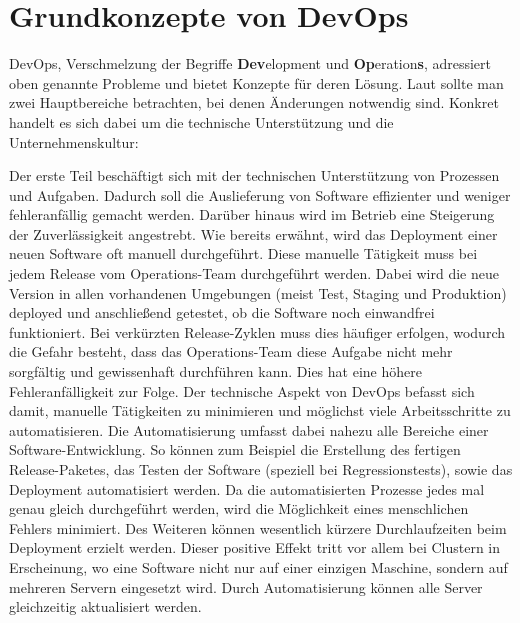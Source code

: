 \section{Grundkonzepte von DevOps}
DevOps, Verschmelzung der Begriffe \textbf{Dev}elopment und \textbf{Op}eration\textbf{s}, adressiert oben genannte Probleme und bietet Konzepte für deren Lösung. Laut \cite{wolff2014} sollte man zwei Hauptbereiche betrachten, bei denen Änderungen notwendig sind. Konkret handelt es sich dabei um die technische Unterstützung und die Unternehmenskultur:

Der erste Teil beschäftigt sich mit der technischen Unterstützung von Prozessen und Aufgaben. Dadurch soll die Auslieferung von Software effizienter und weniger fehleranfällig gemacht werden. Darüber hinaus wird im Betrieb eine Steigerung der Zuverlässigkeit angestrebt. Wie bereits erwähnt, wird das Deployment einer neuen Software oft manuell durchgeführt. Diese manuelle Tätigkeit muss bei jedem Release vom Operations-Team durchgeführt werden. Dabei wird die neue Version in allen vorhandenen Umgebungen (meist Test, Staging und Produktion) deployed und anschließend getestet, ob die Software noch einwandfrei funktioniert. Bei verkürzten Release-Zyklen muss dies häufiger erfolgen, wodurch die Gefahr besteht, dass das Operations-Team diese Aufgabe nicht mehr sorgfältig und gewissenhaft durchführen kann. Dies hat eine höhere Fehleranfälligkeit zur Folge. Der technische Aspekt von DevOps befasst sich damit, manuelle Tätigkeiten zu minimieren und möglichst viele Arbeitsschritte zu automatisieren. Die Automatisierung umfasst dabei nahezu alle Bereiche einer Software-Entwicklung. So können zum Beispiel die Erstellung des fertigen Release-Paketes, das Testen der Software (speziell bei Regressionstests), sowie das Deployment automatisiert werden. Da die automatisierten Prozesse jedes mal genau gleich durchgeführt werden, wird die Möglichkeit eines menschlichen Fehlers minimiert. Des Weiteren können wesentlich kürzere Durchlaufzeiten beim Deployment erzielt werden. Dieser positive Effekt tritt vor allem bei Clustern in Erscheinung, wo eine Software nicht nur auf einer einzigen Maschine, sondern auf mehreren Servern eingesetzt wird. Durch Automatisierung können alle Server gleichzeitig aktualisiert werden.

